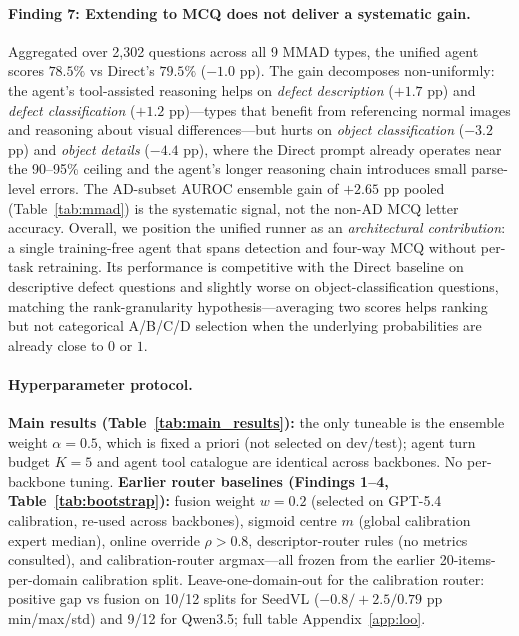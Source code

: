 \paragraph{Finding 7: Extending to MCQ does not deliver a systematic
gain.} Aggregated over 2{,}302 questions across all 9 MMAD types, the
unified agent scores $78.5\%$ vs Direct's $79.5\%$ ($-1.0$
pp). The gain decomposes non-uniformly: the agent's tool-assisted
reasoning helps on \emph{defect description} ($+1.7$ pp) and \emph{defect classification}
($+1.2$ pp)---types that benefit from referencing normal images and
reasoning about visual differences---but hurts on \emph{object
classification} ($-3.2$ pp) and \emph{object details} ($-4.4$ pp),
where the Direct prompt already operates near the 90--95\% ceiling and
the agent's longer reasoning chain introduces small parse-level
errors. The AD-subset AUROC ensemble gain of $+2.65$ pp pooled
(Table~\ref{tab:mmad}) is the systematic signal, not the non-AD MCQ
letter accuracy. Overall, we position the unified runner as an
\emph{architectural contribution}: a single training-free agent that
spans detection and four-way MCQ without per-task retraining. Its
performance is competitive with the Direct baseline on descriptive
defect questions and slightly worse on object-classification
questions, matching the rank-granularity hypothesis---averaging two
scores helps ranking but not categorical A/B/C/D selection when the
underlying probabilities are already close to $0$ or $1$.


\paragraph{Hyperparameter protocol.}
\textbf{Main results (Table~\ref{tab:main_results}):} the only tuneable is the ensemble weight $\alpha{=}0.5$, which is fixed a priori (not selected on dev/test); agent turn budget $K{=}5$ and agent tool catalogue are identical across backbones. No per-backbone tuning. \textbf{Earlier router baselines (Findings 1--4, Table~\ref{tab:bootstrap}):} fusion weight $w{=}0.2$ (selected on GPT-5.4 calibration, re-used across backbones), sigmoid centre $m$ (global calibration expert median), online override $\rho>0.8$, descriptor-router rules (no metrics consulted), and calibration-router argmax---all frozen from the earlier 20-items-per-domain calibration split. Leave-one-domain-out for the calibration router: positive gap vs fusion on 10/12 splits for SeedVL ($-0.8/+2.5/0.79$ pp min/max/std) and 9/12 for Qwen3.5; full table Appendix~\ref{app:loo}.

